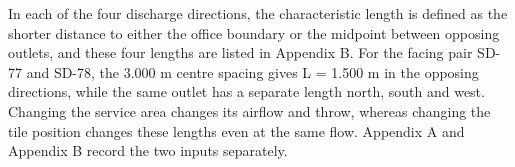 In each of the four discharge directions, the characteristic length is defined as the shorter distance to either the office boundary or the midpoint between opposing outlets, and these four lengths are listed in Appendix B. For the facing pair SD-77 and SD-78, the 3.000 m centre spacing gives L = 1.500 m in the opposing directions, while the same outlet has a separate length north, south and west. Changing the service area changes its airflow and throw, whereas changing the tile position changes these lengths even at the same flow. Appendix A and Appendix B record the two inputs separately.
